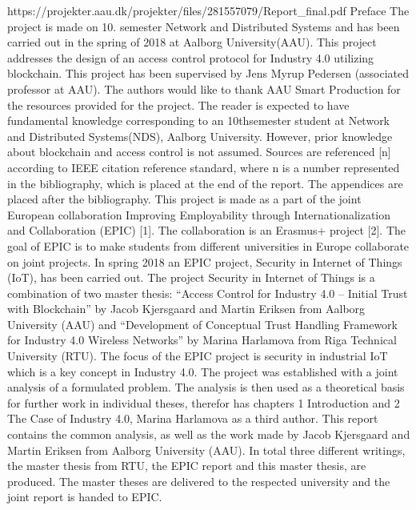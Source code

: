


https://projekter.aau.dk/projekter/files/281557079/Report_final.pdf
Preface
The project is made on 10. semester Network and Distributed Systems and has been
carried out in the spring of 2018 at Aalborg University(AAU). This project addresses
the design of an access control protocol for Industry 4.0 utilizing blockchain.
This project has been supervised by Jens Myrup Pedersen (associated professor at
AAU). The authors would like to thank AAU Smart Production for the resources
provided for the project.
The reader is expected to have fundamental knowledge corresponding to an 10thsemester student at Network and Distributed Systems(NDS), Aalborg University.
However, prior knowledge about blockchain and access control is not assumed.
Sources are referenced [n] according to IEEE citation reference standard, where n is
a number represented in the bibliography, which is placed at the end of the report.
The appendices are placed after the bibliography.
This project is made as a part of the joint European collaboration Improving
Employability through Internationalization and Collaboration (EPIC) [1]. The
collaboration is an Erasmus+ project [2]. The goal of EPIC is to make students from
different universities in Europe collaborate on joint projects. In spring 2018 an EPIC
project, Security in Internet of Things (IoT), has been carried out.
The project Security in Internet of Things is a combination of two master thesis:
“Access Control for Industry 4.0 – Initial Trust with Blockchain” by Jacob Kjersgaard
and Martin Eriksen from Aalborg University (AAU) and “Development of Conceptual
Trust Handling Framework for Industry 4.0 Wireless Networks” by Marina
Harlamova from Riga Technical University (RTU). The focus of the EPIC project is
security in industrial IoT which is a key concept in Industry 4.0. The project was
established with a joint analysis of a formulated problem. The analysis is then used
as a theoretical basis for further work in individual theses, therefor has chapters 1
Introduction and 2 The Case of Industry 4.0, Marina Harlamova as a third author.
This report contains the common analysis, as well as the work made by Jacob
Kjersgaard and Martin Eriksen from Aalborg University (AAU).
In total three different writings, the master thesis from RTU, the EPIC report and
this master thesis, are produced. The master theses are delivered to the respected
university and the joint report is handed to EPIC.